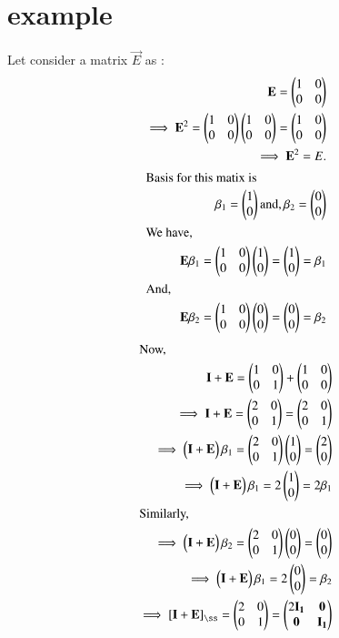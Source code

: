\documentclass[journal,12pt,twocolumn]{IEEEtran}
\begin{document}
	\section{example}
	Let consider a matrix $\vec{E}$ as :
	\begin{align}
	\mathbf{E} =  \begin{pmatrix}1 & 0 \\ 0 & 0\end{pmatrix}\\
	\implies \mathbf{E}^2 = \begin{pmatrix}1 & 0 \\ 0 & 0\end{pmatrix}\begin{pmatrix}1 & 0 \\ 0 & 0\end{pmatrix} = \begin{pmatrix}1 & 0 \\ 0 & 0\end{pmatrix}\\
\implies \mathbf{E}^2 = E.\\
\intertext{Basis for this matix is}
\beta_1 = \begin{pmatrix}1 \\ 0 \end{pmatrix} \text{and}, \beta_2 = \begin{pmatrix}0 \\0\end{pmatrix}\\
\intertext{We have,} 
\mathbf{E}\beta_1 =\begin{pmatrix}1 & 0 \\ 0 & 0\end{pmatrix} \begin{pmatrix}1 \\ 0\end{pmatrix} = \begin{pmatrix}1 \\ 0 \end{pmatrix} = \beta_1\\
\intertext{And,}
\mathbf{E}\beta_2 = \begin{pmatrix}1 & 0 \\ 0 & 0\end{pmatrix}\begin{pmatrix}0 \\ 0 \end{pmatrix}  =  \begin{pmatrix}0 \\ 0\end{pmatrix}= \beta_2
\end{align}
\begin{align}
\intertext{Now,}
\vec{I}+ \vec{E} = \myvec{1 & 0 \\ 0 & 1} + \myvec{ 1 & 0 \\ 0 & 0}\\
\implies \vec{I} + \vec{E} = \myvec{2 & 0 \\ 0 & 1} = \myvec{2 & 0 \\ 0 &1} \label{3.8}\\
\implies \myvec{\vec{I} + \vec{E}} \beta_1 = \myvec{2 & 0 \\ 0 &1}\myvec{1 \\ 0} =  \myvec{2 \\ 0}\\
\implies \myvec{\vec{I} + \vec{E}} \beta_1 = 2 \myvec{1 \\ 0} = 2\beta_1\\
\intertext{Similarly,}
\implies \myvec{\vec{I} + \vec{E}} \beta_2 = \myvec{2 & 0 \\ 0 &1}\myvec{0 \\ 0} =  \myvec{0 \\ 0}\\
\implies \myvec{\vec{I} + \vec{E}} \beta_1 = 2 \myvec{0 \\ 0} = \beta_2\\
\implies \left[ \vec{I} + \vec{E}\right]_{\ss} = \myvec{2 & 0 \\ 0 & 1} = \myvec{2 \vec{I_1} & \vec{0} \\ \vec{0} & \vec{I_1}} \label{2.13}
\end{align}	
\end{document}
